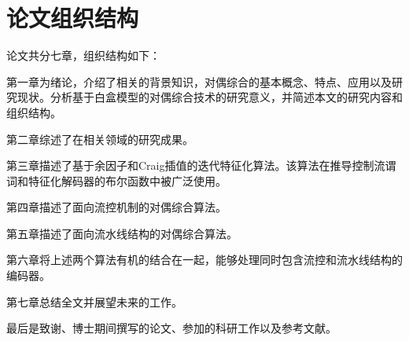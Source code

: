 \section{论文组织结构}
论文共分七章，组织结构如下：

第一章为绪论，介绍了相关的背景知识，对偶综合的基本概念、特点、应用以及研究现状。分析基于白盒模型的对偶综合技术的研究意义，并简述本文的研究内容和组织结构。

第二章综述了在相关领域的研究成果。

第三章描述了基于余因子和Craig插值的迭代特征化算法。该算法在推导控制流谓词和特征化解码器的布尔函数中被广泛使用。

第四章描述了面向流控机制的对偶综合算法。

第五章描述了面向流水线结构的对偶综合算法。

第六章将上述两个算法有机的结合在一起，能够处理同时包含流控和流水线结构的编码器。

第七章总结全文并展望未来的工作。

最后是致谢、博士期间撰写的论文、参加的科研工作以及参考文献。
